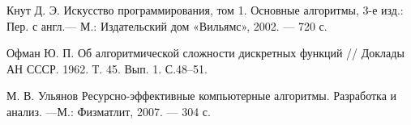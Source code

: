 
\renewcommand\bibname{Список использованных источников}
\begin{thebibliography}{}
	 Кнут Д. Э. Искусство программирования, том 1. Основные алгоритмы, 3-е изд.: Пер. с англ.--- М.: Издательский дом «Вильямс», 2002. — 720 с.
	
	 Офман Ю. П. Об алгоритмической сложности дискретных функций // Доклады АН СССР. 1962. Т. 45. Вып. 1. С.48–51.

	  М. В. Ульянов Ресурсно-эффективные компьютерные алгоритмы. Разработка и анализ. ---М.: Физматлит, 2007. --- 304 с.
	
\end{thebibliography}
